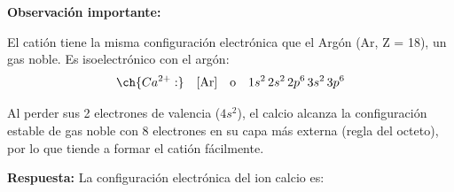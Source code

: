 \begin{exercise}
\begin{solu}
        \textbf{Observación importante:}

        El catión  tiene la misma configuración electrónica que el Argón (Ar, Z = 18), un gas noble. Es isoelectrónico con el argón:
        \[
            \ch{Ca^{2+}:} \quad [\text{Ar}] \quad \text{o} \quad 1s^2 \, 2s^2 \, 2p^6 \, 3s^2 \, 3p^6
        \]

        Al perder sus 2 electrones de valencia (\(4s^2\)), el calcio alcanza la configuración estable de gas noble con 8 electrones en su capa más externa (regla del octeto), por lo que tiende a formar el catión  fácilmente.

        \textbf{Respuesta:} La configuración electrónica del ion calcio es: 
    \end{solu}
\end{exercise}
